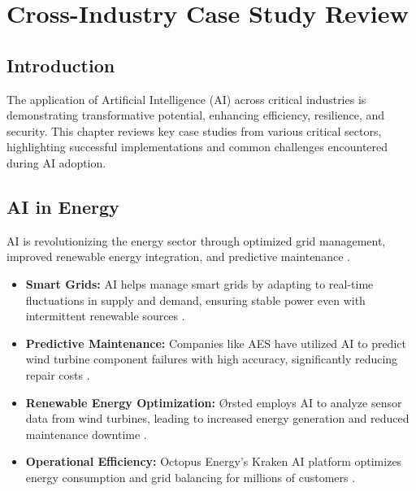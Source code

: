 \chapter{Cross-Industry Case Study Review}
\section{Introduction}
The application of Artificial Intelligence (AI) across critical industries is demonstrating transformative potential, enhancing efficiency, resilience, and security. This chapter reviews key case studies from various critical sectors, highlighting successful implementations and common challenges encountered during AI adoption.

\section{AI in Energy}
AI is revolutionizing the energy sector through optimized grid management, improved renewable energy integration, and predictive maintenance \parencite{smartdev.com}.
\begin{itemize}
    \item \textbf{Smart Grids:} AI helps manage smart grids by adapting to real-time fluctuations in supply and demand, ensuring stable power even with intermittent renewable sources \parencite{checkpoint.com}.
    \item \textbf{Predictive Maintenance:} Companies like AES have utilized AI to predict wind turbine component failures with high accuracy, significantly reducing repair costs \parencite{vktr.com}.
    \item \textbf{Renewable Energy Optimization:} Ørsted employs AI to analyze sensor data from wind turbines, leading to increased energy generation and reduced maintenance downtime \parencite{medium.com}.
    \item \textbf{Operational Efficiency:} Octopus Energy's Kraken AI platform optimizes energy consumption and grid balancing for millions of customers \parencite{smartdev.com}.
\end{itemize}


